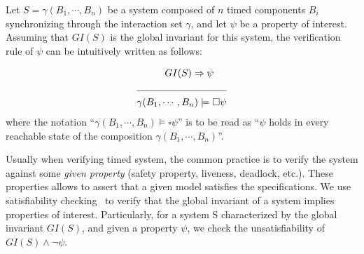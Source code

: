 
Let $S=\gamma(B_1,\cdots,B_n)$ be a system composed of $n$ timed components $B_i$ 
synchronizing through the interaction 
set $\gamma$, and let $\psi$ be a property of interest. Assuming that 
$GI(S)$ is the global invariant for this system, 
the verification rule of $\psi$ can be intuitively
written as follows:

\begin{align*}
  &\hspace{1cm}GI(S)\Rightarrow\psi\\
    \cline{1-2}
   &\gamma(B_1,\cdots,B_n)\models\square\psi
\end{align*}
where the notation \enquote{$\gamma(B_1,\cdots,B_n)\models\square\psi$} is to 
be read as \enquote{$\psi$ holds in every reachable state of the
composition $\gamma(B_1,\cdots,B_n)$}.

Usually when verifying timed system, the common practice is to verify the system 
against some \emph{given property} (safety property, liveness, deadlock, etc.).
These properties allows to assert that a given model satisfies the specifications.
We use satisfiability checking~\cite{} to verify that the global 
invariant of a system 
implies properties of interest. Particularly, for a system S characterized 
by the global invariant $GI(S)$, and 
given a property $\psi$, we check the unsatisfiability of 
$GI(S)\wedge\neg\psi$. 



